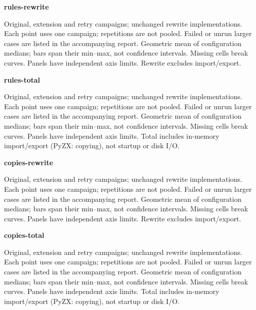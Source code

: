\documentclass{article}
\begin{document}
\begin{center}
\textbf{rules-rewrite}\par\medskip

\end{center}
Original, extension and retry campaigns; unchanged rewrite implementations. Each point uses one campaign; repetitions are not pooled. Failed or unrun larger cases are listed in the accompanying report. Geometric mean of configuration medians; bars span their min--max, not confidence intervals. Missing cells break curves. Panels have independent axis limits. Rewrite excludes import/export.
\clearpage
\begin{center}
\textbf{rules-total}\par\medskip

\end{center}
Original, extension and retry campaigns; unchanged rewrite implementations. Each point uses one campaign; repetitions are not pooled. Failed or unrun larger cases are listed in the accompanying report. Geometric mean of configuration medians; bars span their min--max, not confidence intervals. Missing cells break curves. Panels have independent axis limits. Total includes in-memory import/export (PyZX: copying), not startup or disk I/O.
\clearpage
\begin{center}
\textbf{copies-rewrite}\par\medskip

\end{center}
Original, extension and retry campaigns; unchanged rewrite implementations. Each point uses one campaign; repetitions are not pooled. Failed or unrun larger cases are listed in the accompanying report. Geometric mean of configuration medians; bars span their min--max, not confidence intervals. Missing cells break curves. Panels have independent axis limits. Rewrite excludes import/export.
\clearpage
\begin{center}
\textbf{copies-total}\par\medskip

\end{center}
Original, extension and retry campaigns; unchanged rewrite implementations. Each point uses one campaign; repetitions are not pooled. Failed or unrun larger cases are listed in the accompanying report. Geometric mean of configuration medians; bars span their min--max, not confidence intervals. Missing cells break curves. Panels have independent axis limits. Total includes in-memory import/export (PyZX: copying), not startup or disk I/O.
\clearpage
\end{document}
